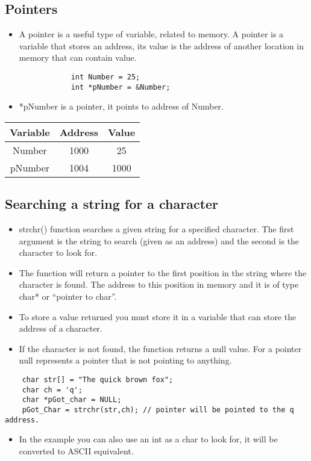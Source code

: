 \subsection{Pointers}
\begin{itemize}
    \item A pointer is a useful type of variable, related to memory. A pointer is a variable that stores an address, its value is the address of another location in memory that can contain value. 
        \begin{verbatim}
            int Number = 25; 
            int *pNumber = &Number; 
        \end{verbatim}
    
    \item *pNumber is a pointer, it points to address of Number. 
\end{itemize}
\begin{center}
    \begin{tabular}{ |c|c|c| }
        \hline
            Variable & Address & Value \\
        \hline \hline
            Number & 1000 & 25 \\ 
        \hline
            pNumber & 1004 & 1000 \\ 
        \hline
    \end{tabular}
\end{center}

\subsection{Searching a string for a character}
\begin{itemize}
    \item strchr() function searches a given string for a specified character. The first argument is the string to search (given as an address) and the second is the character to look for. 
    \item The function will return a pointer to the first position in the string where the character is found. The address to this position in memory and it is of type char* or ``pointer to char''.
    \item To store a value returned you must store it in a variable that can store the address of a character. 
    \item If the character is not found, the function returns a null value. For a pointer null represents a pointer that is not pointing to anything. 
\end{itemize}
\begin{verbatim}
    char str[] = "The quick brown fox"; 
    char ch = 'q';
    char *pGot_char = NULL; 
    pGot_Char = strchr(str,ch); // pointer will be pointed to the q address. 
\end{verbatim}
\begin{itemize}
    \item In the example you can also use an int as a char to look for, it will be converted to ASCII equivalent. 
\end{itemize}

